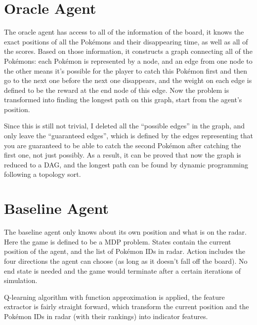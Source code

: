 \documentclass[12pt]{article}
\begin{document}
\section*{Oracle Agent}
The oracle agent has access to all of the
information of the board, it knows the exact positions of all the Pok\'emons
and their disappearing time, as well as all of the scores.
Based on those information, it constructs a graph connecting all of the 
Pok\'emons: each Pok\'emon is represented by a node, and
an edge from one node to the other
means it's possible for the player
to catch this Pok\'emon first and then go to the 
next one before the next one disappears, and the weight on each edge is
defined to be the reward at the end node of this edge. Now the problem 
is transformed into finding 
the longest path on this graph, start from the agent's position.
\par
Since this is still not
trivial, I deleted all the ``possible edges'' in the graph, and only leave 
the ``guaranteed edges'', which is defined by
the edges representing that you are guaranteed to be able to catch the 
second Pok\'emon after catching the first one, not just possibly. As a result, it can be proved that now the 
graph is reduced to a DAG, and the longest path can be found by
dynamic programming following a topology sort.

\section*{Baseline Agent}
The baseline agent only knows about its own position and what is on the radar.
Here the game is defined to be a MDP problem. States contain the 
current position of the agent, and the list of Pok\'emon IDs in radar. Action 
includes the four directions the agent can choose (as long as it doesn't fall
off the board). No end state is needed and the game would terminate after 
a certain iterations of simulation.
\par
Q-learning algorithm with function approximation is applied, the feature 
extractor is fairly straight forward, which transform the current 
position and the Pok\'emon IDs in radar (with their rankings) into 
indicator features.
\end{document}
